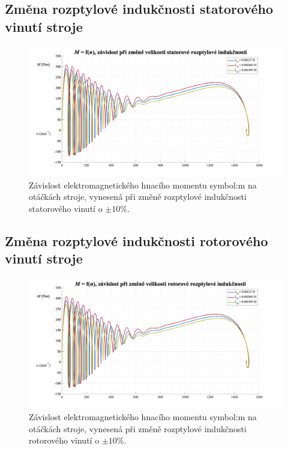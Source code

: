 \documentclass[a4paper, twoside, 11pt]{article}
\newcommand{\fbar}{\FloatBarrier}
\begin{document}
    \fbar
    \subsection{Změna rozptylové indukčnosti statorového vinutí stroje}
        \begin{figure}[htbp!]
            \centering
            \includegraphics[width=1\textwidth]{src/png/mh_dyn_nGraphL1sigma.png}
            \caption{Závislost elektromagnetického hnacího momentu \gls{symbol:m} na otáčkách stroje, vynesená při změně rozptylové indukčnosti statorového vinutí o $\pm 10 \%$.}
            \label{fig:mh_dyn_nGraphL1sigma}
        \end{figure}

    \newpage
    \fbar
    \subsection{Změna rozptylové indukčnosti rotorového vinutí stroje}
        \begin{figure}[htbp!]
            \centering
            \includegraphics[width=1\textwidth]{src/png/mh_dyn_nGraphL2sigma.png}
            \caption{Závislost elektromagnetického hnacího momentu \gls{symbol:m} na otáčkách stroje, vynesená při změně rozptylové indukčnosti rotorového vinutí o $\pm 10 \%$.}
            \label{fig:mh_dyn_nGraphL2sigma}
        \end{figure}
\end{document}
